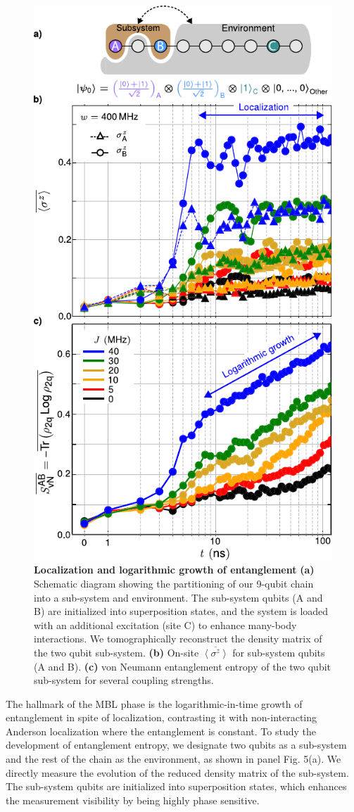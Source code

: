 \begin{figure}[tb!]
    \centering
        \includegraphics[width=70 mm, keepaspectratio]{./PDF/f5_190716_156p.pdf}
        \caption{\small
        \textbf{Localization and logarithmic growth of entanglement}
        \textbf{(a)} Schematic diagram showing the partitioning of our 9-qubit chain into a sub-system and environment.
        The sub-system qubits (A and B) are initialized into superposition states,
        and the system is loaded with an additional excitation (site C) to enhance many-body interactions.
        We tomographically reconstruct the  density matrix of the two qubit sub-system.
        \textbf{(b)} On-site $\overline{\left< \sigma^z \right>}$ for sub-system qubits (A and B).
        \textbf{(c)} von Neumann entanglement entropy of the two qubit sub-system for several coupling strengths. %
        }
        \label{fig_4}
\end{figure}

The hallmark of the MBL phase is the logarithmic-in-time growth of entanglement in spite of localization, contrasting it with non-interacting Anderson localization where the entanglement is constant.
To study the development of entanglement entropy, we designate two qubits as a sub-system and the rest of the chain as the environment, as shown in panel Fig. 5(a).  %
We directly measure the evolution of the reduced density matrix of the sub-system.
The sub-system qubits are initialized into superposition states, which enhances the measurement visibility by being highly phase sensitive.

